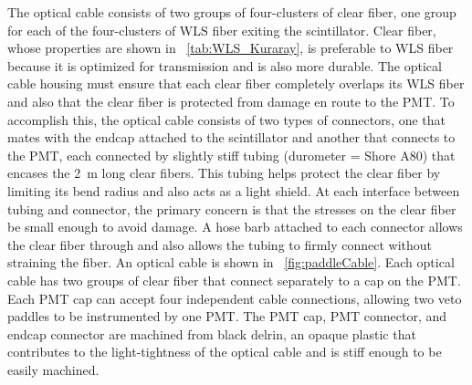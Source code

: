 The optical cable consists of two groups of four-clusters of clear fiber, one group for each of the four-clusters of WLS fiber exiting the scintillator.  Clear fiber, whose properties are shown in {\tab}~\ref{tab:WLS_Kuraray}, is preferable to WLS fiber because it is optimized for transmission and is also more durable.  The optical cable housing must ensure that each clear fiber completely overlaps its WLS fiber and also that the clear fiber is protected from damage en route to the PMT.  To accomplish this, the optical cable consists of two types of connectors, one that mates with the endcap attached to the scintillator and another that connects to the PMT, each connected by slightly stiff tubing (durometer = Shore A80) that encases the 2~m long clear fibers.  This tubing helps protect the clear fiber by limiting its bend radius and also acts as a light shield.  At each interface between tubing and connector, the primary concern is that the stresses on the clear fiber be small enough to avoid damage.  A hose barb attached to each connector allows the clear fiber through and also allows the tubing to firmly connect without straining the fiber.  An optical cable is shown in {\fig}~\ref{fig:paddleCable}.  Each optical cable has two groups of clear fiber that connect separately to a cap on the PMT.  Each PMT cap can accept four independent cable connections, allowing two veto paddles to be instrumented by one PMT.  The PMT cap, PMT connector, and endcap connector are machined from black delrin, an opaque plastic that contributes to the light-tightness of the optical cable and is stiff enough to be easily machined.  
